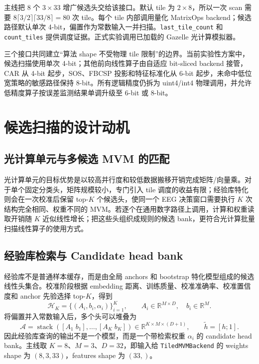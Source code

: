 \documentclass[
    TwoSide=false,
    Degree=graduate,
    GradLevel=master,
    Type=thesis,
    Title={光电混合运动想象脑机接口技术文档}
]{zjuthesis}
\begin{document}
主线把 8 个 $3\times33$ 增广候选头交给该接口。默认 tile 为 $2\times8$，所以一次 scan 需要 $8\lceil3/2\rceil\lceil33/8\rceil=80$ 次 tile。每个 tile 内部调用量化 MatrixOps backend；候选路径默认单次 4-bit，偏置作为常数输入一并扫描。\texttt{last\_tile\_count} 和 \texttt{count\_tiles} 提供调度证据。正式实验调用已加载的 Gazelle 光计算模拟器。

三个接口共同建立“算法 shape 不受物理 tile 限制”的边界。当前实验性方案中，候选扫描使用单次 4-bit；其他前向线性算子由自适应 bit-sliced backend 接管，CAR 从 4-bit 起步，SOS、FBCSP 投影和特征标准化从 6-bit 起步，未命中低位宽策略的敏感路径保持 8-bit。所有逻辑精度仍拆为 uint4/int4 物理调用，并允许低精度算子按误差监测结果单调升级至 6-bit 或 8-bit。

\section{候选扫描的设计动机}
\subsection{光计算单元与多候选 MVM 的匹配}
光计算单元的目标优势是以较高并行度和较低数据搬移开销完成矩阵/向量乘。对于单个固定分类头，矩阵规模较小，专门引入 tile 调度的收益有限；经验库特化则会在一次校准后保留 top-$K$ 个候选头，使同一个 EEG 决策窗口需要执行 $K$ 次结构完全相同、权重不同的 MVM。若逐个在通用数字路径上调用，计算和权重读取开销随 $K$ 近似线性增长；把这些头组织成规则的候选 bank，更符合光计算批量扫描线性算子的使用方式。

\subsection{经验库检索与 Candidate head bank}
经验库不是普通样本缓存，而是由全局 anchors 和 bootstrap 特化模型组成的候选线性头集合。校准阶段根据 embedding 距离、训练质量、校准准确率、校准置信度和 anchor 先验选择 top-$K$，得到
\begin{equation}
\mathcal H_K=\{(A_i,b_i,\alpha_i)\}_{i=1}^{K},
\qquad A_i\in\mathbb{R}^{M\times D},\quad b_i\in\mathbb{R}^{M}.
\end{equation}
将偏置并入常数输入后，多个头可以堆叠为
\begin{equation}
\mathcal A=\operatorname{stack}\left([A_1\;b_1],\ldots,[A_K\;b_K]\right)
\in\mathbb{R}^{K\times M\times(D+1)},
\qquad \widetilde h=[h;1].
\end{equation}
因此经验库查询的输出不是一个模型，而是一个带检索权重 $\alpha_i$ 的 candidate head bank。主线取 $K=8$、$M=3$、$D=32$，即输入给 \texttt{TiledMVMBackend} 的 weights shape 为 $(8,3,33)$，features shape 为 $(33,)$。
\end{document}
